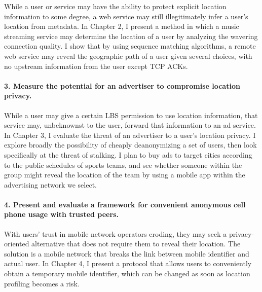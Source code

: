 While a user or service may have the ability to protect explicit location information to some degree, a web service may still illegitimately infer a user's location from metadata. In Chapter 2, I present a method in which a music streaming service may determine the location of a user by analyzing the wavering connection quality. I show that by using sequence matching algorithms, a remote web service may reveal the geographic path of a user given several choices, with no upstream information from the user except TCP ACKs. 

\paragraph*{3. Measure the potential for an advertiser to compromise location privacy.}

While a user may give a certain LBS permission to use location information, that service may, unbeknownst to the user, forward that information to an ad service. In Chapter 3, I evaluate the threat of an advertiser to a user's location privacy. I explore broadly the possibility of cheaply deanonymizing a set of users, then look specifically at the threat of stalking. I plan to buy ads to target cities according to the public schedules of sports teams, and see whether someone within the group might reveal the location of the team by using a mobile app within the advertising network we select.

\paragraph*{4. Present and evaluate a framework for convenient anonymous cell phone usage with trusted peers.}
With users' trust in mobile network operators eroding, they may seek a privacy-oriented alternative that does not require them to reveal their location. The solution is a mobile network that breaks the link between mobile identifier and actual user. In Chapter 4, I present a protocol that allows users to conveniently obtain a temporary mobile identifier, which can be changed as soon as location profiling becomes a risk. 

